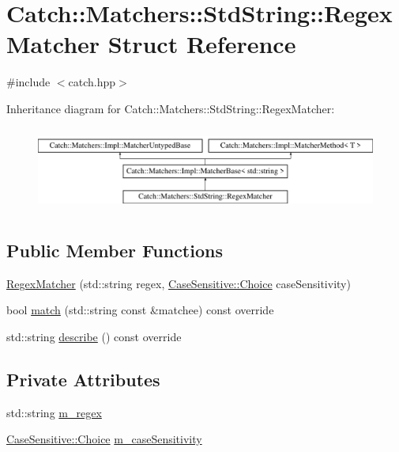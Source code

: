\hypertarget{struct_catch_1_1_matchers_1_1_std_string_1_1_regex_matcher}{}\section{Catch\+::Matchers\+::Std\+String\+::Regex\+Matcher Struct Reference}
\label{struct_catch_1_1_matchers_1_1_std_string_1_1_regex_matcher}


{\ttfamily \#include $<$catch.\+hpp$>$}

Inheritance diagram for Catch\+::Matchers\+::Std\+String\+::Regex\+Matcher\+:\begin{figure}[H]
\begin{center}
\leavevmode
\includegraphics[height=2.818792cm]{struct_catch_1_1_matchers_1_1_std_string_1_1_regex_matcher}
\end{center}
\end{figure}
\subsection*{Public Member Functions}
\begin{DoxyCompactItemize}
\item 
\mbox{\hyperlink{struct_catch_1_1_matchers_1_1_std_string_1_1_regex_matcher_ab914deb885fe25558c41ab368c6b3916}{Regex\+Matcher}} (std\+::string regex, \mbox{\hyperlink{struct_catch_1_1_case_sensitive_aad49d3aee2d97066642fffa919685c6a}{Case\+Sensitive\+::\+Choice}} case\+Sensitivity)
\item 
bool \mbox{\hyperlink{struct_catch_1_1_matchers_1_1_std_string_1_1_regex_matcher_aa8e61adccabb2f36133029301f6b8f4e}{match}} (std\+::string const \&matchee) const override
\item 
std\+::string \mbox{\hyperlink{struct_catch_1_1_matchers_1_1_std_string_1_1_regex_matcher_a1f788cd5258c987e5043f6c7f43adeb9}{describe}} () const override
\end{DoxyCompactItemize}
\subsection*{Private Attributes}
\begin{DoxyCompactItemize}
\item 
std\+::string \mbox{\hyperlink{struct_catch_1_1_matchers_1_1_std_string_1_1_regex_matcher_af1020e7266bcfa76ffad011ff89ea14e}{m\+\_\+regex}}
\item 
\mbox{\hyperlink{struct_catch_1_1_case_sensitive_aad49d3aee2d97066642fffa919685c6a}{Case\+Sensitive\+::\+Choice}} \mbox{\hyperlink{struct_catch_1_1_matchers_1_1_std_string_1_1_regex_matcher_afb5fb3d3734c4e882162b51559d09bd4}{m\+\_\+case\+Sensitivity}}
\end{DoxyCompactItemize}
